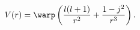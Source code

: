 \begin{equation} \label{potential}
V(r) = \warp \left( \frac{l(l+1)}{r^2} + \frac{1 - j^2}{r^3} \right).
\end{equation}

